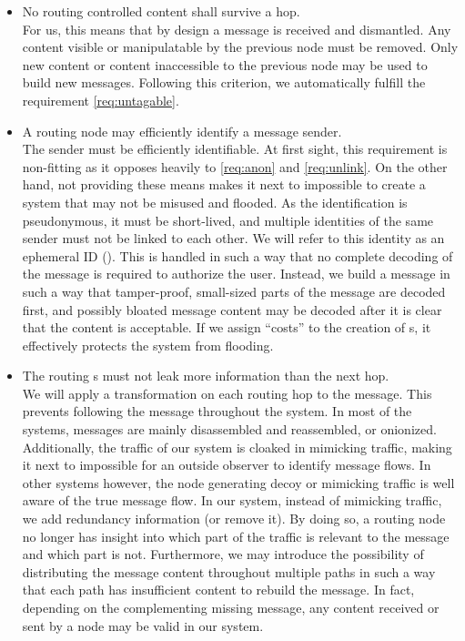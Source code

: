 \begin{itemize}
	\item No routing controlled content shall survive a hop.\\
	For us, this means that by design a message is received and dismantled. Any content visible or manipulatable by the previous node must be removed. Only new content or content inaccessible to the previous node may be used to build new messages. Following this criterion, we automatically fulfill the requirement \ref{req:untagable}.
	\item A routing node may efficiently identify a message sender.\\      
	The sender must be efficiently identifiable. At first sight, this requirement is non-fitting as it opposes heavily to \ref{req:anon} and \ref{req:unlink}. On the other hand, not providing these means makes it next to impossible to create a system that may not be misused and flooded. As the identification is pseudonymous, it must be short-lived, and multiple identities of the same sender must not be linked to each other. We will refer to this identity as an ephemeral ID (). This  is handled in such a way that no complete decoding of the message is required to authorize the user. Instead, we build a message in such a way that tamper-proof, small-sized parts of the message are decoded first, and possibly bloated message content may be decoded after it is clear that the content is acceptable. If we assign ``costs'' to the creation of s, it effectively protects the system from flooding.
	\item The routing s must not leak more information than the next hop.\\
	We will apply a transformation on each routing hop to the message. This prevents following the message throughout the system. In most of the systems, messages are mainly disassembled and reassembled, or onionized. Additionally, the traffic of our system is cloaked in mimicking traffic, making it next to impossible for an outside observer to identify message flows. In other systems however, the node generating decoy or mimicking traffic is well aware of the true message flow. In our system, instead of mimicking traffic, we add redundancy information (or remove it). By doing so, a routing node no longer has insight into which part of the traffic is relevant to the message and which part is not. Furthermore, we may introduce the possibility of distributing the message content throughout multiple paths in such a way that each path has insufficient content to rebuild the message. In fact, depending on the complementing missing message, any content received or sent by a node may be valid in our system. 

\end{itemize}
